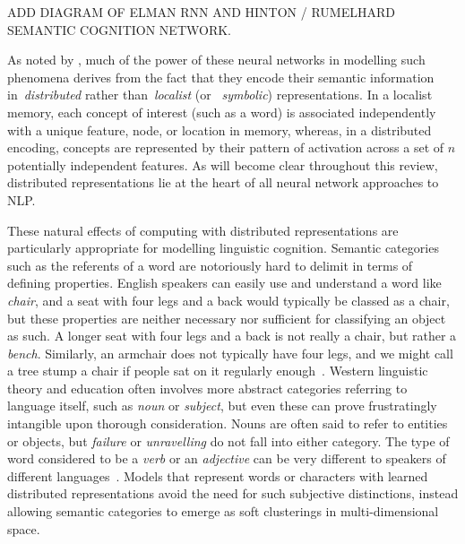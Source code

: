 \documentclass[11pt,letterpaper]{article}
\begin{document}
ADD DIAGRAM OF ELMAN RNN AND HINTON / RUMELHARD SEMANTIC COGNITION NETWORK. 

As noted by \cite{hinton1986learning}, much of the power of these neural networks in modelling such phenomena derives from the fact that they encode their semantic information in~\emph{distributed} rather than~\emph{localist} (or ~\emph{symbolic}) representations. In a localist memory, each concept of interest (such as a word) is associated independently with a unique feature, node, or location in memory, whereas, in a distributed encoding, concepts are represented by their pattern of activation across a set of \(n\) potentially independent features. As will become clear throughout this review, distributed representations lie at the heart of all neural network approaches to NLP. 

These natural effects of computing with distributed representations are particularly appropriate for modelling linguistic cognition. Semantic categories such as the referents of a word are notoriously hard to delimit in terms of defining properties\cite{fauconnier1994mental}. English speakers can easily use and understand a word like \emph{chair}, and a seat with four legs and a back would typically be classed as a chair, but these properties are neither necessary nor sufficient for classifying an object as such. A longer seat with four legs and a back is not really a chair, but rather a \emph{bench}. Similarly, an armchair does not typically have four legs, and we might call a tree stump a chair if people sat on it regularly enough~\cite{prinz2004furnishing}. 
Western linguistic theory and education often involves more abstract categories referring to language itself, such as \emph{noun} or \emph{subject}, but even these can prove frustratingly intangible upon thorough consideration. Nouns are often said to refer to entities or objects, but \emph{failure} or \emph{unravelling} do not fall into either category. The type of word considered to be a \emph{verb} or an \emph{adjective} can be very different to speakers of different languages~\cite{anward1997parts}. Models that represent words or characters with learned distributed representations avoid the need for such subjective distinctions, instead allowing semantic categories to emerge as soft clusterings in multi-dimensional space.  
 
\end{document}
